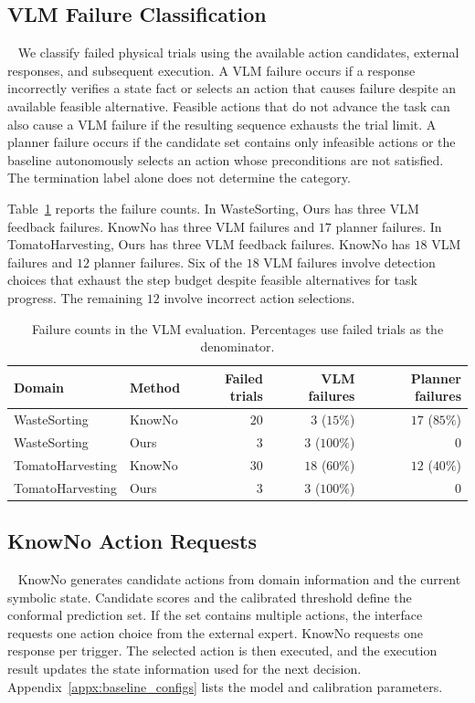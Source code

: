 \subsection{VLM Failure Classification}~\label{appx:vlm_failure_analysis}
We classify failed physical trials using the available action candidates, external responses, and subsequent execution. A VLM failure occurs if a response incorrectly verifies a state fact or selects an action that causes failure despite an available feasible alternative. Feasible actions that do not advance the task can also cause a VLM failure if the resulting sequence exhausts the trial limit. A planner failure occurs if the candidate set contains only infeasible actions or the baseline autonomously selects an action whose preconditions are not satisfied. The termination label alone does not determine the category.

Table~\ref{tab:app_vlm_failures} reports the failure counts. In WasteSorting, Ours has three VLM feedback failures. KnowNo has three VLM failures and $17$ planner failures. In TomatoHarvesting, Ours has three VLM feedback failures. KnowNo has $18$ VLM failures and $12$ planner failures. Six of the $18$ VLM failures involve detection choices that exhaust the step budget despite feasible alternatives for task progress. The remaining $12$ involve incorrect action selections.

\begin{table}[!htbp]
\centering
\caption{Failure counts in the VLM evaluation. Percentages use failed trials as the denominator.}
\label{tab:app_vlm_failures}
\small
\begin{tabular}{llrrr}
\toprule
Domain & Method & Failed trials & VLM failures & Planner failures \\
\midrule
WasteSorting & KnowNo & $20$ & $3$ ($15\%$) & $17$ ($85\%$) \\
WasteSorting & Ours & $3$ & $3$ ($100\%$) & $0$ \\
TomatoHarvesting & KnowNo & $30$ & $18$ ($60\%$) & $12$ ($40\%$) \\
TomatoHarvesting & Ours & $3$ & $3$ ($100\%$) & $0$ \\
\bottomrule
\end{tabular}
\end{table}

\subsection{KnowNo Action Requests}~\label{appx:knowno_impl}
KnowNo generates candidate actions from domain information and the current symbolic state. Candidate scores and the calibrated threshold define the conformal prediction set. If the set contains multiple actions, the interface requests one action choice from the external expert. KnowNo requests one response per trigger. The selected action is then executed, and the execution result updates the state information used for the next decision. Appendix~\ref{appx:baseline_configs} lists the model and calibration parameters.
